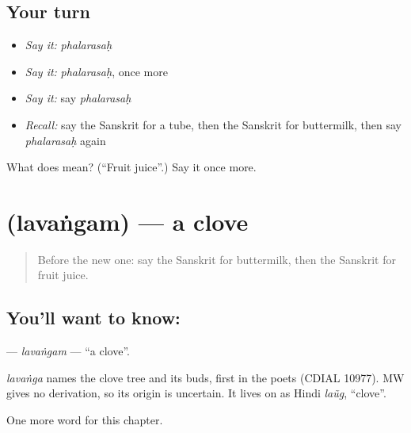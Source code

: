 \subsection*{Your turn}
\begin{itemize}
\raggedright
  \item \emph{Say it:} \emph{phalarasaḥ}
  \item \emph{Say it:} \emph{phalarasaḥ}, once more
  \item \emph{Say it:} say \emph{phalarasaḥ}
  \item \emph{Recall:} say the Sanskrit for a tube, then the Sanskrit for buttermilk, then say \emph{phalarasaḥ} again
\end{itemize}

\begin{tcolorbox}[breakable,colback=teal!4,colframe=teal!35!black,title={Before you move on}]
What does  mean? (\textquotedblleft{}Fruit juice\textquotedblright{}.) Say it once more.
\end{tcolorbox}
\section[\texorpdfstring{\sk{लवंगम्} (lavaṅgam)}{लवंगम् (lavaṅgam)}]{ (lavaṅgam) — a clove}

\label{lesson:SA-C245-lavangam}



\begin{quote}
Before the new one: say the Sanskrit for buttermilk, then the Sanskrit for fruit juice.
\end{quote}

\subsection*{You'll want to know: }
\textbf{} — \emph{lavaṅgam} — \textquotedblleft{}a clove\textquotedblright{}.

\begin{cousinweb}
\emph{lavaṅga} names the clove tree and its buds, first in the poets (CDIAL 10977). MW gives no derivation, so its origin is uncertain. It lives on as Hindi \emph{laũg}, \textquotedblleft{}clove\textquotedblright{}.
\end{cousinweb}

\begin{grammarlens}[title={What you've built}]
One more word for this chapter.
\end{grammarlens}

